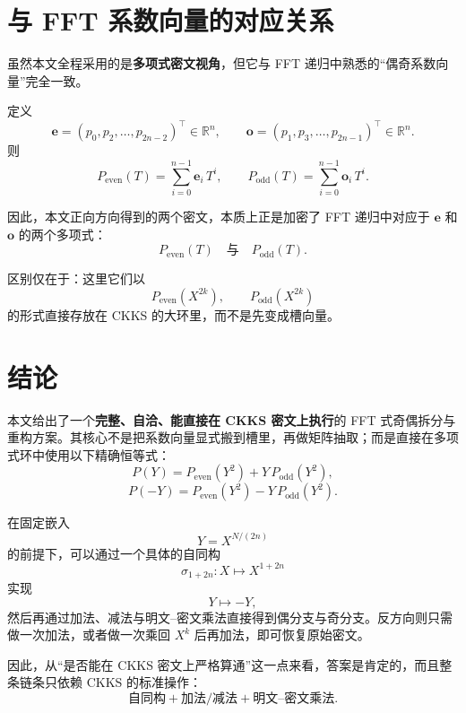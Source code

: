 \documentclass[11pt,a4paper]{ctexart}
\newcommand{\RR}{\mathbb{R}}
\begin{document}
\section{与 FFT 系数向量的对应关系}

虽然本文全程采用的是\textbf{多项式密文视角}，但它与 FFT 递归中熟悉的“偶奇系数向量”完全一致。

定义
\[
\mathbf{e}=(p_0,p_2,\dots,p_{2n-2})^\top\in\RR^n,
\qquad
\mathbf{o}=(p_1,p_3,\dots,p_{2n-1})^\top\in\RR^n.
\]
则
\[
P_{\mathrm{even}}(T)=\sum_{i=0}^{n-1}\mathbf{e}_i\,T^i,
\qquad
P_{\mathrm{odd}}(T)=\sum_{i=0}^{n-1}\mathbf{o}_i\,T^i.
\]

因此，本文正向方向得到的两个密文，本质上正是加密了 FFT 递归中对应于 \(\mathbf e\) 和 \(\mathbf o\) 的两个多项式：
\[
P_{\mathrm{even}}(T)
\quad\text{与}\quad
P_{\mathrm{odd}}(T).
\]

区别仅在于：这里它们以
\[
P_{\mathrm{even}}(X^{2k}),\qquad P_{\mathrm{odd}}(X^{2k})
\]
的形式直接存放在 CKKS 的大环里，而不是先变成槽向量。

\section{结论}

本文给出了一个\textbf{完整、自洽、能直接在 CKKS 密文上执行}的 FFT 式奇偶拆分与重构方案。其核心不是把系数向量显式搬到槽里，再做矩阵抽取；而是直接在多项式环中使用以下精确恒等式：
\[
P(Y)=P_{\mathrm{even}}(Y^2)+Y\,P_{\mathrm{odd}}(Y^2),
\]
\[
P(-Y)=P_{\mathrm{even}}(Y^2)-Y\,P_{\mathrm{odd}}(Y^2).
\]

在固定嵌入
\[
Y=X^{N/(2n)}
\]
的前提下，可以通过一个具体的自同构
\[
\sigma_{1+2n}: X\mapsto X^{1+2n}
\]
实现
\[
Y\mapsto -Y,
\]
然后再通过加法、减法与明文--密文乘法直接得到偶分支与奇分支。反方向则只需做一次加法，或者做一次乘回 \(X^k\) 后再加法，即可恢复原始密文。

因此，从“是否能在 CKKS 密文上严格算通”这一点来看，答案是肯定的，而且整条链条只依赖 CKKS 的标准操作：
\[
\text{自同构} + \text{加法/减法} + \text{明文--密文乘法}.
\]
\end{document}
